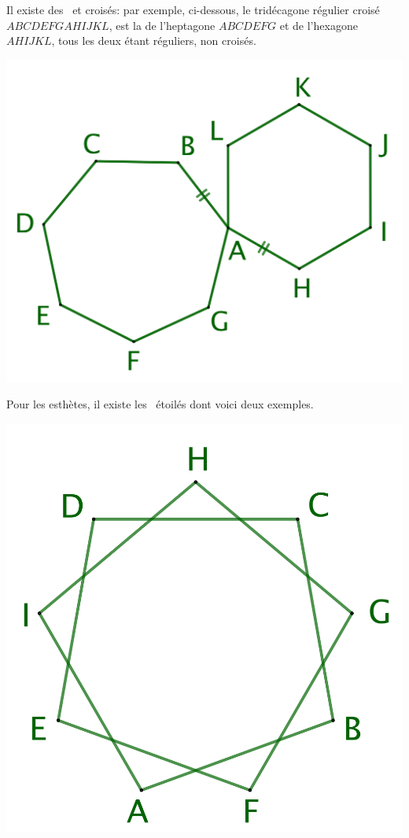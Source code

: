 \begin{remark}
	Il existe des \nregs\ et croisés: par exemple, ci-dessous, le tridécagone régulier croisé $ABCDEFGAHIJKL$, est la  de l'heptagone $ABCDEFG$ et de l'hexagone $AHIJKL$, tous les deux étant réguliers, non croisés.
	
	\begin{center}
	    \includegraphics[scale=.35]{content/polygon/ncycle-ngone/nreg+kreg.png}
	\end{center}


	Pour les esthètes, il existe les \nregs\ étoilés dont voici deux exemples.

    \vspace{-1.5em}
    
    \begin{multicols}{2}
    	\small\itshape\centering
    	
	    \null\vfill

	    \includegraphics[scale=.175]{content/polygon/ncycle-ngone/9-iso-non-conv.png}
    

\end{multicols}
\end{remark}
